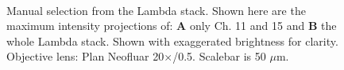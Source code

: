 \begin{figure}[h!]
\centering
\vspace{-0.7em}
\captionsetup[subfigure]{position=bottom}
\hspace{0.1mm}
\\
\caption{Manual selection from the Lambda stack. 
Shown here are the maximum intensity projections of: \textbf{A} only Ch. 11 and 15 and \textbf{B} the whole Lambda stack. 
Shown with exaggerated brightness for clarity.  
Objective lens: Plan Neofluar 20$\times$/0.5. 
Scalebar is 50 $\mu$m.} 
\label{fig:manlinun}
\end{figure}

